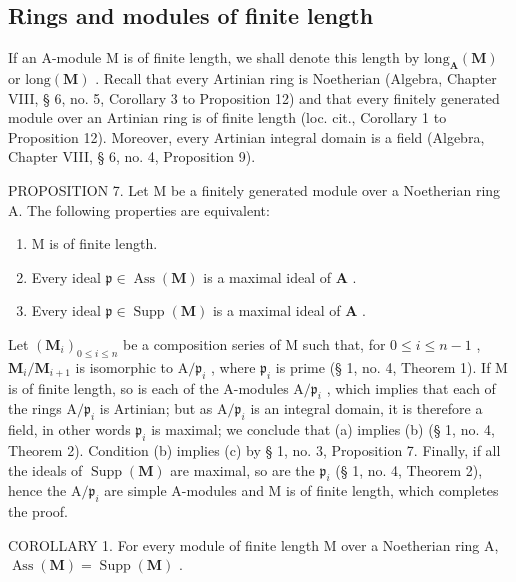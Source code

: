 \subsection{Rings and modules of finite length}

If an A-module M is of finite length, we shall denote this length by \(\text{long}_{\mathbf{A}}(\mathbf{M})\) or \(\text{long}(\mathbf{M})\) . Recall that every Artinian ring is Noetherian (Algebra, Chapter VIII, § 6, no. 5, Corollary 3 to Proposition 12) and that every finitely generated module over an Artinian ring is of finite length (loc. cit., Corollary 1 to Proposition 12). Moreover, every Artinian integral domain is a field (Algebra, Chapter VIII, § 6, no. 4, Proposition 9).

PROPOSITION 7. Let M be a finitely generated module over a Noetherian ring A. The following properties are equivalent:

\begin{enumerate}
\def\labelenumi{(\alph{enumi})}
\item
  M is of finite length.
\item
  Every ideal \(\mathfrak{p} \in \operatorname{Ass}(\mathbf{M})\) is a maximal ideal of \(\mathbf{A}\) .
\item
  Every ideal \(\mathfrak{p} \in \operatorname{Supp}(\mathbf{M})\) is a maximal ideal of \(\mathbf{A}\) .
\end{enumerate}

Let \((\mathbf{M}_i)_{0\leqslant i\leqslant n}\) be a composition series of M such that, for \(0\leqslant i\leqslant n - 1\) , \(\mathbf{M}_i / \mathbf{M}_{i + 1}\) is isomorphic to \(\mathrm{A} / \mathfrak{p}_i\) , where \(\mathfrak{p}_i\) is prime (§ 1, no. 4, Theorem 1). If M is of finite length, so is each of the A-modules \(\mathrm{A} / \mathfrak{p}_i\) , which implies that each of the rings \(\mathrm{A} / \mathfrak{p}_i\) is Artinian; but as \(\mathrm{A} / \mathfrak{p}_i\) is an integral domain, it is therefore a field, in other words \(\mathfrak{p}_i\) is maximal; we conclude that (a) implies (b) (§ 1, no. 4, Theorem 2). Condition (b) implies (c) by § 1, no. 3, Proposition 7. Finally, if all the ideals of \(\operatorname {Supp}(\mathbf{M})\) are maximal, so are the \(\mathfrak{p}_i\) (§ 1, no. 4, Theorem 2), hence the \(\mathrm{A} / \mathfrak{p}_i\) are simple A-modules and M is of finite length, which completes the proof.

COROLLARY 1. For every module of finite length M over a Noetherian ring A, \(\operatorname{Ass}(\mathbf{M}) = \operatorname{Supp}(\mathbf{M})\) .

